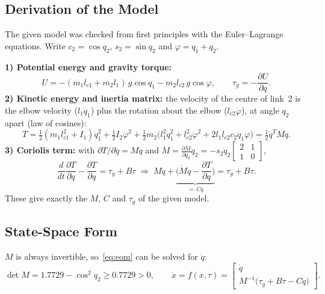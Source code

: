\documentclass[12pt,a4paper]{article}
\begin{document}
\subsection{Derivation of the Model}
The given model was checked from first principles with the Euler--Lagrange equations. Write $c_2=\cos q_2$, $s_2=\sin q_2$ and $\varphi=q_1+q_2$.

\textbf{1) Potential energy and gravity torque:}
\begin{equation}
U=-(m_1l_{c1}+m_2l_1)\,g\cos q_1-m_2l_{c2}\,g\cos\varphi,\qquad \tau_g=-\frac{\partial U}{\partial q} .
\end{equation}
\textbf{2) Kinetic energy and inertia matrix:} the velocity of the centre of link~2 is the elbow velocity ($l_1\dot q_1$) plus the rotation about the elbow ($l_{c2}\dot\varphi$), at angle $q_2$ apart (law of cosines):
\begin{equation}
T=\tfrac12(m_1l_{c1}^2+I_1)\dot q_1^2+\tfrac12I_2\dot\varphi^2+\tfrac12m_2\big(l_1^2\dot q_1^2+l_{c2}^2\dot\varphi^2+2l_1l_{c2}c_2\dot q_1\dot\varphi\big)=\tfrac12\dot q^TM\dot q .
\end{equation}
\textbf{3) Coriolis term:} with $\partial T/\partial\dot q=M\dot q$ and $\dot M=\frac{\partial M}{\partial q_2}\dot q_2=-s_2\dot q_2\left[\begin{smallmatrix}2&1\\1&0\end{smallmatrix}\right]$,
\begin{equation}
\frac{d}{dt}\frac{\partial T}{\partial\dot q}-\frac{\partial T}{\partial q}=\tau_g+B\tau
\;\Rightarrow\; M\ddot q+\underbrace{\Big(\dot M\dot q-\frac{\partial T}{\partial q}\Big)}_{=\,C\dot q}=\tau_g+B\tau .
\end{equation}
These give exactly the $M$, $C$ and $\tau_g$ of the given model.

\subsection{State-Space Form}
$M$ is always invertible, so~\eqref{eq:eom} can be solved for $\ddot q$:
\begin{equation}
\det M=1.7729-\cos^2q_2\ge0.7729>0,\qquad
\dot x=f(x,\tau)=\begin{bmatrix}\dot q\\ M^{-1}\big(\tau_g+B\tau-C\dot q\big)\end{bmatrix}.\label{eq:f}
\end{equation}

\end{document}

